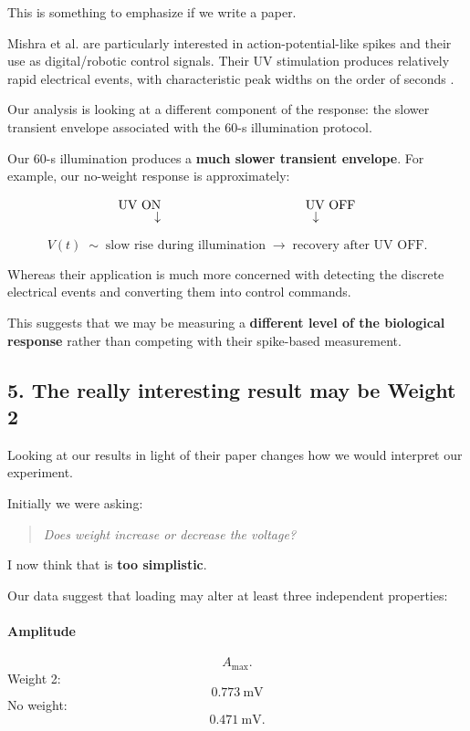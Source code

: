 \documentclass[11pt,a4paper]{article}
\begin{document}
This is something to emphasize if we write a paper.

Mishra et al. are particularly interested in action-potential-like spikes and
their use as digital/robotic control signals. Their UV stimulation produces
relatively rapid electrical events, with characteristic peak widths on the
order of seconds \cite{Mishra2024}.

Our analysis is looking at a different component of the response: the slower
transient envelope associated with the 60-s illumination protocol.

Our 60-s illumination produces a \textbf{much slower transient envelope}.
For example, our no-weight response is approximately:

\[
\begin{array}{c}
\text{UV ON}\hspace{4cm}\text{UV OFF}\\[-1mm]
\downarrow\hspace{4.2cm}\downarrow
\end{array}
\]

\[
V(t)\;\sim\;
\text{slow rise during illumination}
\;\longrightarrow\;
\text{recovery after UV OFF}.
\]

Whereas their application is much more concerned with detecting the discrete
electrical events and converting them into control commands.

This suggests that we may be measuring a \textbf{different level of the
biological response} rather than competing with their spike-based
measurement.

\subsection{5. The really interesting result may be Weight 2}

Looking at our results in light of their paper changes how we would interpret
our experiment.

Initially we were asking:

\begin{quote}
\emph{Does weight increase or decrease the voltage?}
\end{quote}

I now think that is \textbf{too simplistic}.

Our data suggest that loading may alter at least three independent
properties:

\paragraph{Amplitude}
\[
A_{\max}.
\]
Weight 2:
\[
0.773\ \mathrm{mV}
\]
No weight:
\[
0.471\ \mathrm{mV}.
\]
\end{document}
